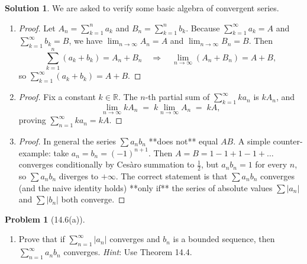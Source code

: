 \documentclass[12pt]{article}
\theoremstyle{definition} %
\newtheorem{solution}{Solution}
\newtheorem{problem}{Problem}
\theoremstyle{plain} %
\begin{document}
\begin{solution}
   We are asked to verify some basic algebra of convergent series.
   \begin{enumerate}
   \item \begin{proof}
     Let $A_n=\sum_{k=1}^{n} a_k$ and $B_n=\sum_{k=1}^{n} b_k$.
     Because $\displaystyle\sum_{k=1}^{\infty} a_k = A$ and
     $\displaystyle\sum_{k=1}^{\infty} b_k = B$, we have
     $\lim_{n\to\infty}A_n=A$ and $\lim_{n\to\infty}B_n=B$.
     Then
     \[
        \sum_{k=1}^{n}(a_k+b_k)=A_n+B_n
        \quad\Longrightarrow\quad
        \lim_{n\to\infty}(A_n+B_n)=A+B,
     \]
     so $\displaystyle\sum_{k=1}^{\infty}(a_k+b_k)=A+B$.
   \end{proof}
 
   \item \begin{proof}
     Fix a constant $k\in\mathbb R$.  The $n$-th partial sum of
     $\displaystyle\sum_{k=1}^{\infty} k a_n$ is
     $kA_n$, and
     \[
       \lim_{n\to\infty} kA_n \;=\;
       k\lim_{n\to\infty} A_n \;=\; kA,
     \]
     proving $\displaystyle\sum_{n=1}^{\infty} ka_n = kA$.
   \end{proof}
 
   \item \begin{proof}
     In general the series $\displaystyle\sum a_n b_n$
     **does not** equal $AB$.
     A simple counter-example: take $a_n=b_n=(-1)^{n+1}$.
     Then $A=B=1-1+1-1+\dots$ converges conditionally by Cesàro
     summation to $\tfrac12$, but $a_nb_n=1$ for every $n$, so
     $\displaystyle\sum a_nb_n$ diverges to $+\infty$.
     The correct statement is that
     $\displaystyle\sum a_n b_n$ converges (and the naive identity
     holds) **only if** the series of absolute values
     $\sum|a_n|$ and $\sum|b_n|$ both converge.
   \end{proof}
   \end{enumerate}
 \end{solution} 
\begin{problem}[14.6(a)]
    \begin{enumerate}
        \item Prove that if $\sum_{n=1}^{\infty} \left\vert a_{n}  \right\vert $ converges and $b_{n} $ is a bounded sequence, then $\sum_{n=1}^{\infty} a_{n}b_{n} $ converges. \emph{Hint}: Use Theorem 14.4. 
    \end{enumerate}
    
\end{problem}
\end{document}
